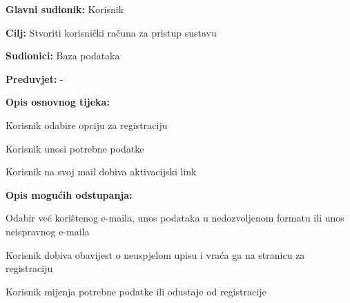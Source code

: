 \noindent {}
					\begin{packed_item}
	
						\item \textbf{Glavni sudionik: }Korisnik
						\item \textbf{Cilj:} Stvoriti korisnički računa za pristup sustavu
						\item \textbf{Sudionici:} Baza podataka
						\item \textbf{Preduvjet:} -
						\item \textbf{Opis osnovnog tijeka:}
						
						\item[] \begin{packed_enum}
	
							\item Korisnik odabire opciju za registraciju
							\item Korisnik unosi potrebne podatke
							\item Korisnik na svoj mail dobiva aktivacijski link
							
						\end{packed_enum}
						
						\item  \textbf{Opis mogućih odstupanja:}
						
						\item[] \begin{packed_item}
	
							\item[2.a] Odabir već korištenog e-maila, unos podataka u nedozvoljenom formatu ili unos neispravnog e-maila
							\item[] \begin{packed_enum}
								
								\item Korisnik dobiva obavijest o neuspjelom upisu i vraća ga na stranicu za registraciju
								\item Korisnik mijenja potrebne podatke ili odustaje od registracije
								
							\end{packed_enum}
							
							
						\end{packed_item}
					\end{packed_item}
\eject 
\noindent {}
